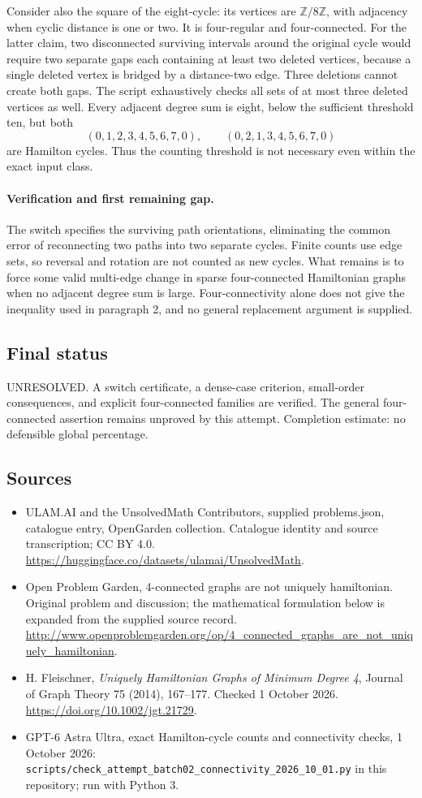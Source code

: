 \documentclass[11pt,a4paper]{article}
\begin{document}
Consider also the square of the eight-cycle: its vertices are
$\mathbb Z/8\mathbb Z$, with adjacency when cyclic distance is one
or two. It is four-regular and four-connected. For the latter claim,
two disconnected surviving intervals around the original cycle would
require two separate gaps each containing at least two deleted
vertices, because a single deleted vertex is bridged by a distance-two
edge. Three deletions cannot create both gaps. The script exhaustively
checks all sets of at most three deleted vertices as well. Every
adjacent degree sum is eight, below the sufficient threshold ten,
but both
\[
 (0,1,2,3,4,5,6,7,0),\qquad (0,2,1,3,4,5,6,7,0)
\]
are Hamilton cycles. Thus the counting threshold is not necessary
even within the exact input class.

\paragraph{Verification and first remaining gap.}
The switch specifies the surviving path orientations, eliminating the
common error of reconnecting two paths into two separate cycles.
Finite counts use edge sets, so reversal and rotation are not counted
as new cycles. What remains is to force some valid multi-edge change
in sparse four-connected Hamiltonian graphs when no adjacent degree
sum is large. Four-connectivity alone does not give the inequality
used in paragraph 2, and no general replacement argument is supplied.

\subsection{Final status}
UNRESOLVED. A switch certificate, a dense-case criterion, small-order
consequences, and explicit four-connected families are verified. The
general four-connected assertion remains unproved by this attempt.
Completion estimate: no defensible global percentage.

\subsection{Sources}
\begin{itemize}
\item[S1] ULAM.AI and the UnsolvedMath Contributors, supplied problems.json, catalogue entry, OpenGarden collection. Catalogue identity and source transcription; CC BY 4.0.
\url{https://huggingface.co/datasets/ulamai/UnsolvedMath}.
\item[S2] Open Problem Garden, 4-connected graphs are not uniquely hamiltonian. Original problem and discussion; the mathematical formulation below is expanded from the supplied source record.
\url{http://www.openproblemgarden.org/op/4_connected_graphs_are_not_uniquely_hamiltonian}.
\item[S3] H. Fleischner, \emph{Uniquely Hamiltonian Graphs of Minimum Degree 4}, Journal of Graph Theory 75 (2014), 167--177. Checked 1 October 2026.
\url{https://doi.org/10.1002/jgt.21729}.
\item[S4] GPT-6 Astra Ultra, exact Hamilton-cycle counts and connectivity checks, 1 October 2026: \texttt{scripts/check\_attempt\_batch02\_connectivity\_2026\_10\_01.py} in this repository; run with Python 3.
\end{itemize}
\end{document}
